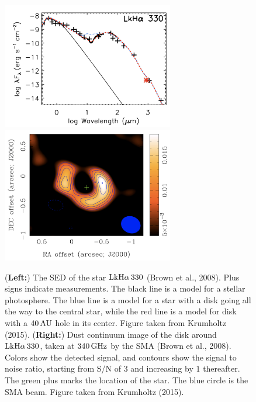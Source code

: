\documentclass[a4paper,10pt]{article}
\begin{document}
\begin{figure}[t]
    \centering
    \includegraphics[width=7.5cm]{figures/LkHa330.png}
    \includegraphics[width=7.5cm]{figures/LkHa330_cont.png}
    \caption{\footnotesize{(\textbf{Left:}) The SED of the star ${\rm LkH}\alpha\,330$ (Brown et al., 2008). Plus signs indicate measurements. The black line is a model for a stellar photosphere. The blue line is a model for a star with a disk going all the way to the central star, while the red line is a model for disk with a $40\,{\rm AU}$ hole in its center. Figure taken from Krumholtz (2015). (\textbf{Right:}) Dust continuum image of the disk around ${\rm LkH}\alpha\,330$, taken at $340\,{\rm GHz}$ by the SMA (Brown et al., 2008). Colors show the detected signal, and contours show the signal to noise ratio, starting from S/N of $3$ and increasing by $1$ thereafter. The green plus marks the location of the star. The blue circle is the SMA beam. Figure taken from Krumholtz (2015).}}
    \label{fig:lkha330}
\end{figure}
\end{document}
